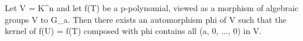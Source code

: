 Let V = K^n and let f(T) be a p-polynomial, viewed as a morphism of algebraic groups V to G_a. Then there exists an automorphism phi of V such that the kernel of f(U) = f(T) composed with phi contains all (a, 0, ..., 0) in V.
